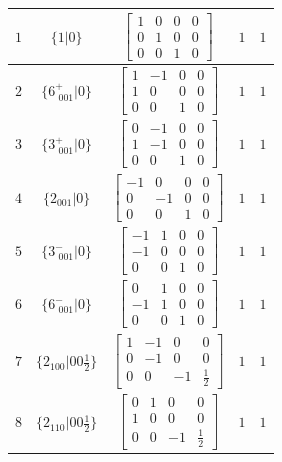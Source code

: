 \documentclass[fleqn,8pt]{jsarticle}
\begin{document}
\begin{longtable}{ccccc}
$ 1 $ & $ \{1|0\} $ & $ \begin{bmatrix} 1 & 0 & 0 & 0 \\ 0 & 1 & 0 & 0 \\ 0 & 0 & 1 & 0 \end{bmatrix} $ & $ 1 $ & $ 1 $ \\ \hline
$ 2 $ & $ \{6^{+}_{\,\,001}|0\} $ & $ \begin{bmatrix} 1 & -1 & 0 & 0 \\ 1 & 0 & 0 & 0 \\ 0 & 0 & 1 & 0 \end{bmatrix} $ & $ 1 $ & $ 1 $ \\ \hline
$ 3 $ & $ \{3^{+}_{\,\,001}|0\} $ & $ \begin{bmatrix} 0 & -1 & 0 & 0 \\ 1 & -1 & 0 & 0 \\ 0 & 0 & 1 & 0 \end{bmatrix} $ & $ 1 $ & $ 1 $ \\ \hline
$ 4 $ & $ \{2{}_{001}|0\} $ & $ \begin{bmatrix} -1 & 0 & 0 & 0 \\ 0 & -1 & 0 & 0 \\ 0 & 0 & 1 & 0 \end{bmatrix} $ & $ 1 $ & $ 1 $ \\ \hline
$ 5 $ & $ \{3^{-}_{\,\,001}|0\} $ & $ \begin{bmatrix} -1 & 1 & 0 & 0 \\ -1 & 0 & 0 & 0 \\ 0 & 0 & 1 & 0 \end{bmatrix} $ & $ 1 $ & $ 1 $ \\ \hline
$ 6 $ & $ \{6^{-}_{\,\,001}|0\} $ & $ \begin{bmatrix} 0 & 1 & 0 & 0 \\ -1 & 1 & 0 & 0 \\ 0 & 0 & 1 & 0 \end{bmatrix} $ & $ 1 $ & $ 1 $ \\ \hline
$ 7 $ & $ \{2{}_{100}|0 0 \frac{1}{2}\} $ & $ \begin{bmatrix} 1 & -1 & 0 & 0 \\ 0 & -1 & 0 & 0 \\ 0 & 0 & -1 & \frac{1}{2} \end{bmatrix} $ & $ 1 $ & $ 1 $ \\ \hline
$ 8 $ & $ \{2{}_{110}|0 0 \frac{1}{2}\} $ & $ \begin{bmatrix} 0 & 1 & 0 & 0 \\ 1 & 0 & 0 & 0 \\ 0 & 0 & -1 & \frac{1}{2} \end{bmatrix} $ & $ 1 $ & $ 1 $ \\ \hline

\end{longtable}
\end{document}
